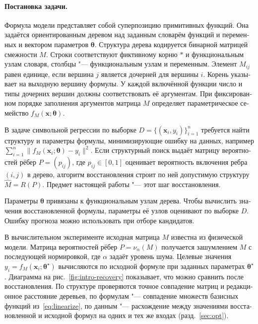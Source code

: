 \documentclass[12pt]{article}
\newif\ifhighlight \highlighttrue
\newenvironment{ru}{\begin{otherlanguage}{russian}\ifhighlight\color{blue}\fi}{\end{otherlanguage}}
\newcommand{\vx}{\mathbf{x}}
\newcommand{\tht}{\bm{\theta}}
\begin{document}
\begin{ru}
\paragraph{Постановка задачи.}
Формула модели представляет собой суперпозицию примитивных функций.
Она задаётся ориентированным деревом над заданным словарём функций и переменных и вектором параметров $\tht$. Структура дерева кодируется бинарной матрицей смежности $M$. Строки соответствуют фиктивному корню $\ast$ и функциональным узлам словаря, столбцы "--- функциональным узлам и переменным. Элемент $M_{ij}$ равен единице, если вершина $j$ является дочерней для вершины $i$. Корень указывает на выходную вершину формулы. У каждой включённой функции число и типы дочерних вершин должны соответствовать её аргументам. При фиксированном порядке заполнения аргументов матрица $M$ определяет параметрическое семейство $f_M(\vx;\tht)$.

В задаче символьной регрессии по выборке $D=\{(\vx_i,y_i)\}_{i=1}^{n}$ требуется найти структуру и параметры формулы, минимизирующие ошибку на данных, например $\sum_{i=1}^{n}\|f_M(\vx_i;\tht)-y_i\|^2$. Если структурный поиск выдаёт матрицу вероятностей рёбер $P=(p_{ij})$, где $p_{ij}\in[0,1]$ оценивает вероятность включения ребра $(i,j)$ в дерево, алгоритм восстановления строит по ней допустимую структуру $\hat M=R(P)$. Предмет настоящей работы "--- этот шаг восстановления.

Параметры $\tht$ привязаны к функциональным узлам дерева. Чтобы вычислить значения восстановленной формулы, параметры её узлов оценивают по выборке $D$. Ошибку прогноза можно использовать при отборе кандидатов.

В вычислительном эксперименте исходная матрица $M$ известна из физической модели. Матрица вероятностей рёбер $P=\nu_\alpha(M)$ получается зашумлением $M$ с последующей нормировкой, где $\alpha$ задаёт уровень шума. Целевые значения $y_i=f_M(\vx_i;\tht^\star)$ вычисляются по исходной формуле при заданных параметрах $\tht^\star$. Диаграмма на рис.~\ref{fig:intro-recovery} показывает, что можно сравнить после восстановления. По структуре проверяются точное совпадение матриц и редакционное расстояние деревьев, по формулам "--- совпадение множеств базисных функций из~\eqref{eq:linearize}, по данным "--- расхождение между значениями восстановленной и исходной формул на одних и тех же входах (разд.~\ref{sec:opt}).


\end{ru}
\end{document}
